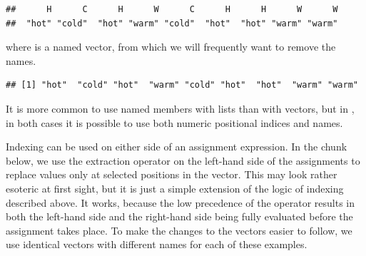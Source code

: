 \documentclass[krantz2]{krantz}\usepackage{knitr}
\begin{document}
\begin{explainbox}
\begin{knitrout}\footnotesize
{}\color{fgcolor}\begin{kframe}
\begin{alltt}
 \hlkwb{<-} 
\end{alltt}
\begin{verbatim}
##      H      C      H      W      C      H      H      W      W 
##  "hot" "cold"  "hot" "warm" "cold"  "hot"  "hot" "warm" "warm"
\end{verbatim}
\end{kframe}
\end{knitrout}

where  is a named vector, from which we will frequently want to remove the names.

\begin{knitrout}\footnotesize
{}\color{fgcolor}\begin{kframe}
\begin{alltt}
 \hlkwb{<-} 
\end{alltt}
\begin{verbatim}
## [1] "hot"  "cold" "hot"  "warm" "cold" "hot"  "hot"  "warm" "warm"
\end{verbatim}
\end{kframe}
\end{knitrout}

It is more common to use named members with lists than with vectors, but in \Rlang, in both cases it is possible to use both numeric positional indices and names.
\end{explainbox}

Indexing can be used on either side of an assignment expression. In the chunk below, we use the extraction operator on the left-hand side of the assignments to replace values only at selected positions in the vector. This may look rather esoteric at first sight, but it is just a simple extension of the logic of indexing described above. It works, because the low precedence of the \Roperator{<-} operator results in both the left-hand side and the right-hand side being fully evaluated before the assignment takes place. To make the changes to the vectors easier to follow, we use identical vectors with different names for each of these examples.
\end{document}
